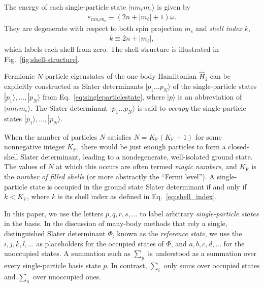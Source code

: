 \documentclass[aip, jcp, 12pt]{revtex4-1}
\begin{document}
The energy of each single-particle state $|n m_\ell m_{\mathrm{s}}\rangle$ is given by
\begin{align} \label{eq:energysingleparticlestate}
  \varepsilon_{n m_\ell m_{\mathrm{s}}} \equiv (2 n + |m_\ell| + 1) \omega.
\end{align}
They are degenerate with respect to both spin projection $m_{\mathrm{s}}$ and \textit{shell index} $k$,
\begin{align} \label{eq:shell_index}
  k \equiv 2 n + |m_\ell|,
\end{align}
which labels each shell from zero.  The shell structure is illustrated in Fig.\ \ref{fig:shell-structure}.

Fermionic $N$-particle eigenstates of the one-body Hamiltonian $\hat{H}_1$ can be explicitly constructed as Slater determinants $|p_1 \ldots p_N\rangle$ of the single-particle states $|p_1\rangle, \ldots, |p_N\rangle$ from Eq.\ \eqref{eq:singleparticlestate}, where $|p\rangle$ is an abbreviation of $|n m_\ell m_{\mathrm{s}}\rangle$.  The Slater determinant $|p_1 \ldots p_N\rangle$ is said to \textit{occupy} the single-particle states $|p_1\rangle, \ldots, |p_N\rangle$.

When the number of particles $N$ satisfies $N = K_{\mathrm{F}} (K_{\mathrm{F}} + 1)$ for some nonnegative integer $K_{\mathrm{F}}$, there would be just enough particles to form a closed-shell Slater determinant, leading to a nondegenerate, well-isolated ground state.  The values of $N$ at which this occurs are often termed \textit{magic numbers}, and $K_{\mathrm{F}}$ is the \textit{number of filled shells} (or more abstractly the ``Fermi level'').  A single-particle state is occupied in the ground state Slater determinant if and only if $k < K_{\mathrm{F}}$, where $k$ is its shell index as defined in Eq.\ \eqref{eq:shell_index}.

In this paper, we use the letters $p, q, r, s, \ldots$ to label arbitrary \textit{single-particle states} in the basis.  In the discussion of many-body methods that rely a single, distinguished Slater determinant $\Phi$, known as the \textit{reference state}, we use the $i, j, k, l, \ldots$ as placeholders for the occupied states of $\Phi$, and $a, b, c, d, \ldots$ for the unoccupied states.  A summation such as $\sum_p$ is understood as a summation over every single-particle basis state $p$.  In contrast, $\sum_i$ only sums over occupied states and $\sum_a$ over unoccupied ones.
\end{document}
